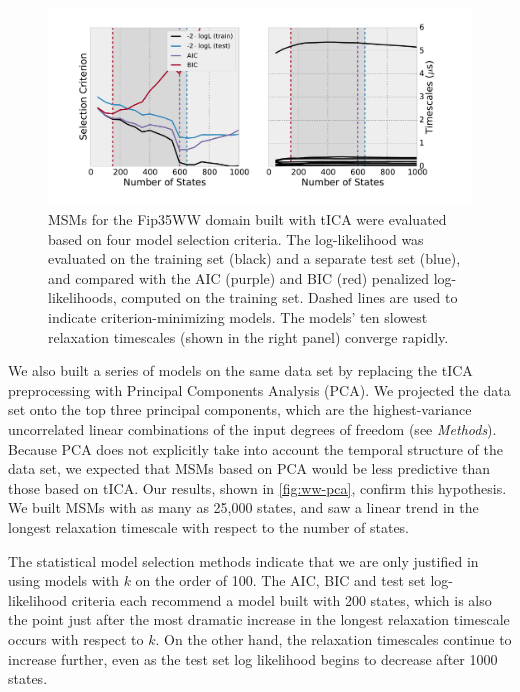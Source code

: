 \documentclass[journal=jpcbfk, layout=traditional, manuscript=article]{achemso}
\begin{document}
\begin{figure}
\centering
\label{fig:ww-tica}
\includegraphics[width=6in]{figs/ww_tica/ww_tica.pdf}

\caption{MSMs for the Fip35WW domain built with tICA were evaluated based on four model selection criteria. The log-likelihood was evaluated on the training set (black) and a separate test set (blue), and compared with the AIC (purple) and BIC (red) penalized log-likelihoods, computed on the training set. Dashed lines are used to indicate criterion-minimizing models. The models' ten slowest relaxation timescales (shown in the right panel) converge rapidly. }
\end{figure}

We also built a series of models on the same data set by replacing the tICA preprocessing with Principal Components Analysis (PCA). We projected the data set onto the top three principal components, which are the highest-variance uncorrelated linear combinations of the input degrees of freedom (see \emph{Methods}). Because PCA does not explicitly take into account the temporal structure of the data set, we expected that MSMs based on PCA would be less predictive than those based on tICA. Our results, shown in \cref{fig:ww-pca}, confirm this hypothesis. We built MSMs with as many as 25,000 states, and saw a linear trend in the longest relaxation timescale with respect to the number of states.

The statistical model selection methods indicate that we are only justified in using models with $k$ on the order of 100. The AIC, BIC and test set log-likelihood criteria each recommend a model built with 200 states, which is also the point just after the most dramatic increase in the longest relaxation timescale occurs with respect to $k$. On the other hand, the relaxation timescales continue to increase further, even as the test set log likelihood begins to decrease after 1000 states.
\end{document}
